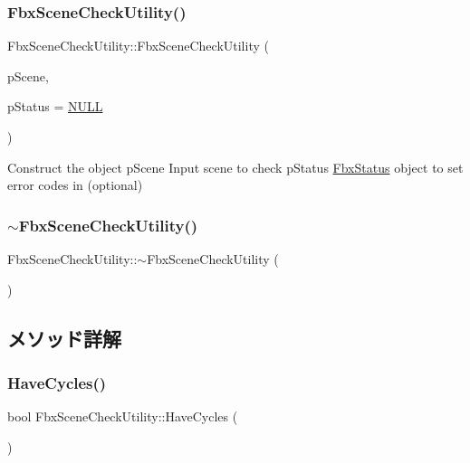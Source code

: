 \subsubsection{\texorpdfstring{Fbx\+Scene\+Check\+Utility()}{FbxSceneCheckUtility()}}
{\footnotesize\ttfamily Fbx\+Scene\+Check\+Utility\+::\+Fbx\+Scene\+Check\+Utility (\begin{DoxyParamCaption}\item[{const \hyperlink{class_fbx_scene}{Fbx\+Scene} $\ast$}]{p\+Scene,  }\item[{\hyperlink{class_fbx_status}{Fbx\+Status} $\ast$}]{p\+Status = {\ttfamily \hyperlink{fbxarch_8h_a070d2ce7b6bb7e5c05602aa8c308d0c4}{N\+U\+LL}} }\end{DoxyParamCaption})}

Construct the object p\+Scene Input scene to check p\+Status \hyperlink{class_fbx_status}{Fbx\+Status} object to set error codes in (optional) \mbox{\label{class_fbx_scene_check_utility_ac626dec2f6a4f4584e4a914ce9a68226}} 
\subsubsection{\texorpdfstring{$\sim$\+Fbx\+Scene\+Check\+Utility()}{~FbxSceneCheckUtility()}}
{\footnotesize\ttfamily Fbx\+Scene\+Check\+Utility\+::$\sim$\+Fbx\+Scene\+Check\+Utility (\begin{DoxyParamCaption}{ }\end{DoxyParamCaption})}



\subsection{メソッド詳解}
\mbox{\label{class_fbx_scene_check_utility_a3998b242e9585b74917e7cd081dd9a5e}} 
\subsubsection{\texorpdfstring{Have\+Cycles()}{HaveCycles()}}
{\footnotesize\ttfamily bool Fbx\+Scene\+Check\+Utility\+::\+Have\+Cycles (\begin{DoxyParamCaption}{ }\end{DoxyParamCaption})\hspace{0.3cm}{\ttfamily [protected]}}

